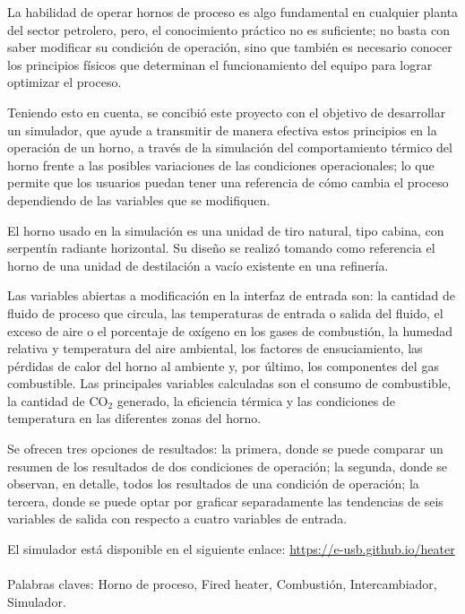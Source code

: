 \documentclass[pregrado]{tesis-usb}
\begin{document}
\frontmatter
\maketitle


\begin{resumen}
    \par La habilidad de operar hornos de proceso es algo fundamental en cualquier planta del sector petrolero, pero, el conocimiento práctico no es suficiente; no basta con saber modificar su condición de operación, sino que también es necesario conocer los principios físicos que determinan el funcionamiento del equipo para lograr optimizar el proceso.
    \par Teniendo esto en cuenta, se concibió este proyecto con el objetivo de desarrollar un simulador, que ayude a transmitir de manera efectiva estos principios en la operación de un horno, a través de la simulación del comportamiento térmico del horno frente a las posibles variaciones de las condiciones operacionales; lo que permite que los usuarios puedan tener una referencia de cómo cambia el proceso dependiendo de las variables que se modifiquen.
    \par El horno usado en la simulación es una unidad de tiro natural, tipo cabina, con serpentín radiante horizontal. Su diseño se realizó tomando como referencia el horno de una unidad de destilación a vacío existente en una refinería.
    \par Las variables abiertas a modificación en la interfaz de entrada son: la cantidad de fluido de proceso que circula, las temperaturas de entrada o salida del fluido, el exceso de aire o el porcentaje de oxígeno en los gases de combustión, la humedad relativa y temperatura del aire ambiental, los factores de ensuciamiento, las pérdidas de calor del horno al ambiente y, por último, los componentes del gas combustible. Las principales variables calculadas son el consumo de combustible, la cantidad de CO$_2$ generado, la eficiencia térmica y las condiciones de temperatura en las diferentes zonas del horno.
    \par Se ofrecen tres opciones de resultados: la primera, donde se puede comparar un resumen de los resultados de dos condiciones de operación; la segunda, donde se observan, en detalle, todos los resultados de una condición de operación; la tercera, donde se puede optar por graficar separadamente las tendencias de seis variables de salida con respecto a cuatro variables de entrada.
    \par El simulador está disponible en el siguiente enlace: \url{https://e-usb.github.io/heater}\\
     \vspace{10pt}\\
     Palabras claves: Horno de proceso, Fired heater, Combustión, Intercambiador, Simulador.
\end{resumen}
\tableofcontents
\listoffigures
\listoftables
\useacronyms


\setlength{\parskip}{6px}
\mainmatter









\nocite{*}

\appendix



\end{document}

